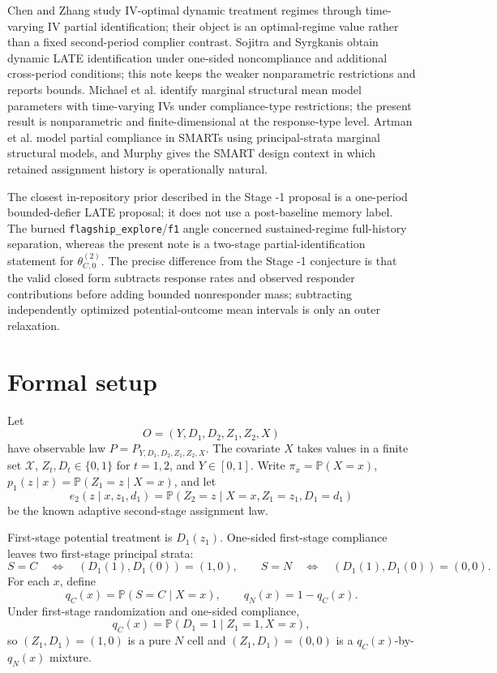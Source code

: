 \documentclass[11pt]{article}
\renewcommand{\Pr}{\mathbb{P}}
\theoremstyle{definition}
\theoremstyle{plain}
\theoremstyle{remark}
\begin{document}
Chen and Zhang \cite{ChenZhang2023} study IV-optimal dynamic treatment regimes through time-varying IV partial identification; their object is an optimal-regime value rather than a fixed second-period complier contrast.  Sojitra and Syrgkanis \cite{SojitraSyrgkanis2024} obtain dynamic LATE identification under one-sided noncompliance and additional cross-period conditions; this note keeps the weaker nonparametric restrictions and reports bounds.  Michael et al. \cite{MichaelCuiLorchTchetgen2024} identify marginal structural mean model parameters with time-varying IVs under compliance-type restrictions; the present result is nonparametric and finite-dimensional at the response-type level.  Artman et al. \cite{ArtmanBhattacharyaErtefaieLynchMcKayJohnson2024} model partial compliance in SMARTs using principal-strata marginal structural models, and Murphy \cite{Murphy2005} gives the SMART design context in which retained assignment history is operationally natural.

The closest in-repository prior described in the Stage -1 proposal is a one-period bounded-defier LATE proposal; it does not use a post-baseline memory label.  The burned \texttt{flagship\_explore}/\texttt{f1} angle concerned sustained-regime full-history separation, whereas the present note is a two-stage partial-identification statement for
\(\theta_{C,0}^{(2)}\).  The precise difference from the Stage -1 conjecture is that the valid closed form subtracts response rates and observed responder contributions before adding bounded nonresponder mass; subtracting independently optimized potential-outcome mean intervals is only an outer relaxation.

\section{Formal setup}
Let
\[
O=(Y,D_1,D_2,Z_1,Z_2,X)
\]
have observable law \(P=P_{Y,D_1,D_2,Z_1,Z_2,X}\).  The covariate \(X\) takes values in a finite set \(\mathcal X\), \(Z_t,D_t\in\{0,1\}\) for \(t=1,2\), and \(Y\in[0,1]\).  Write
\(\pi_x=\Pr(X=x)\),
\(p_1(z\mid x)=\Pr(Z_1=z\mid X=x)\), and let
\[
e_2(z\mid x,z_1,d_1)=\Pr(Z_2=z\mid X=x,Z_1=z_1,D_1=d_1)
\]
be the known adaptive second-stage assignment law.

First-stage potential treatment is \(D_1(z_1)\).  One-sided first-stage compliance leaves two first-stage principal strata:
\[
S=C\quad\Longleftrightarrow\quad (D_1(1),D_1(0))=(1,0),
\qquad
S=N\quad\Longleftrightarrow\quad (D_1(1),D_1(0))=(0,0).
\]
For each \(x\), define
\[
q_C(x)=\Pr(S=C\mid X=x),\qquad q_N(x)=1-q_C(x).
\]
Under first-stage randomization and one-sided compliance,
\[
q_C(x)=\Pr(D_1=1\mid Z_1=1,X=x),
\]
so \((Z_1,D_1)=(1,0)\) is a pure \(N\) cell and \((Z_1,D_1)=(0,0)\) is a \(q_C(x)\)-by-\(q_N(x)\) mixture.
\end{document}
